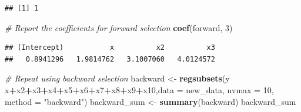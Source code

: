 \documentclass[]{article}
\newenvironment{Shaded}{\begin{snugshade}}{\end{snugshade}}
\newcommand{\KeywordTok}[1]{\textcolor[rgb]{0.13,0.29,0.53}{\textbf{#1}}}
\newcommand{\DataTypeTok}[1]{\textcolor[rgb]{0.13,0.29,0.53}{#1}}
\newcommand{\DecValTok}[1]{\textcolor[rgb]{0.00,0.00,0.81}{#1}}
\newcommand{\StringTok}[1]{\textcolor[rgb]{0.31,0.60,0.02}{#1}}
\newcommand{\CommentTok}[1]{\textcolor[rgb]{0.56,0.35,0.01}{\textit{#1}}}
\newcommand{\OperatorTok}[1]{\textcolor[rgb]{0.81,0.36,0.00}{\textbf{#1}}}
\newcommand{\NormalTok}[1]{#1}
\begin{document}
\begin{Shaded}
\end{Shaded}

\begin{verbatim}
## [1] 1
\end{verbatim}

\begin{Shaded}
\begin{Highlighting}[]
\CommentTok{# Report the coefficients for forward selection}
\KeywordTok{coef}\NormalTok{(forward, }\DecValTok{3}\NormalTok{)}
\end{Highlighting}
\end{Shaded}

\begin{verbatim}
## (Intercept)           x          x2          x3 
##   0.8941296   1.9814762   3.1007060   4.0124572
\end{verbatim}

\begin{Shaded}
\begin{Highlighting}[]
\CommentTok{# Repeat using backward selection}
\NormalTok{backward <-}\StringTok{ }\KeywordTok{regsubsets}\NormalTok{(y }\OperatorTok{~}\StringTok{ }\NormalTok{x}\OperatorTok{+}\NormalTok{x2}\OperatorTok{+}\NormalTok{x3}\OperatorTok{+}\NormalTok{x4}\OperatorTok{+}\NormalTok{x5}\OperatorTok{+}\NormalTok{x6}\OperatorTok{+}\NormalTok{x7}\OperatorTok{+}\NormalTok{x8}\OperatorTok{+}\NormalTok{x9}\OperatorTok{+}\NormalTok{x10,}\DataTypeTok{data =}\NormalTok{ new_data, }\DataTypeTok{nvmax =} \DecValTok{10}\NormalTok{, }\DataTypeTok{method =} \StringTok{"backward"}\NormalTok{)}
\NormalTok{backward_sum <-}\StringTok{ }\KeywordTok{summary}\NormalTok{(backward)}
\NormalTok{backward_sum}
\end{Highlighting}
\end{Shaded}
\end{document}
